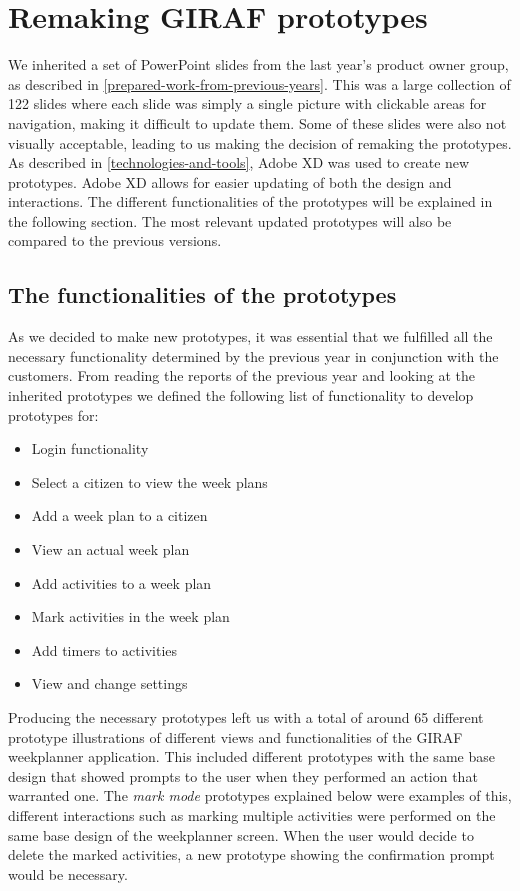 \section{Remaking GIRAF prototypes}\label{prototype-comp}
We inherited a set of PowerPoint slides from the last year's product owner group, as described in \autoref{prepared-work-from-previous-years}.
This was a large collection of 122 slides where each slide was simply a single picture with clickable areas for navigation, making it difficult to update them.
Some of these slides were also not visually acceptable, leading to us making the decision of remaking the prototypes.
As described in \autoref{technologies-and-tools}, Adobe XD was used to create new prototypes.
Adobe XD allows for easier updating of both the design and interactions.
The different functionalities of the prototypes will be explained in the following section.
The most relevant updated prototypes will also be compared to the previous versions.

\subsection{The functionalities of the prototypes}
As we decided to make new prototypes, it was essential that we fulfilled all the necessary functionality determined by the previous year in conjunction with the customers.
From reading the reports of the previous year and looking at the inherited prototypes we defined the following list of functionality to develop prototypes for:
\begin{itemize}
    \item Login functionality
    \item Select a citizen to view the week plans
    \item Add a week plan to a citizen
    \item View an actual week plan
    \item Add activities to a week plan
    \item Mark activities in the week plan
    \item Add timers to activities
    \item View and change settings
\end{itemize}
Producing the necessary prototypes left us with a total of around 65 different prototype illustrations of different views and functionalities of the GIRAF weekplanner application.
This included different prototypes with the same base design that showed prompts to the user when they performed an action that warranted one.
The \textit{mark mode} prototypes explained below were examples of this, different interactions such as marking multiple activities were performed on the same base design of the weekplanner screen.
When the user would decide to delete the marked activities, a new prototype showing the confirmation prompt would be necessary.

